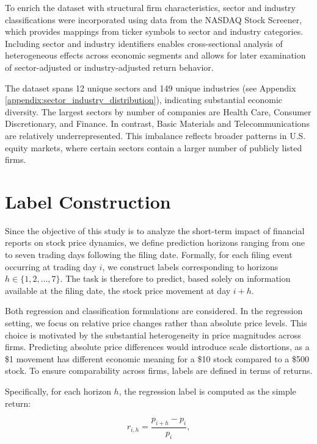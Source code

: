 To enrich the dataset with structural firm characteristics, sector and industry classifications were incorporated using data from the NASDAQ Stock Screener\cite{nasdaq_screener}, which provides mappings from ticker symbols to sector and industry categories. 
Including sector and industry identifiers enables cross-sectional analysis of heterogeneous effects across economic segments and allows for later examination of sector-adjusted or industry-adjusted return behavior.

The dataset spans 12 unique sectors and 149 unique industries (see Appendix \ref{appendix:sector_industry_distribution}), indicating substantial economic diversity. 
The largest sectors by number of companies are Health Care, Consumer Discretionary, and Finance. In contrast, Basic Materials and Telecommunications are relatively underrepresented. This imbalance reflects broader patterns in U.S. equity markets, where certain sectors contain a larger number of publicly listed firms.

\section{Label Construction}

Since the objective of this study is to analyze the short-term impact of financial reports on stock price dynamics, we define prediction horizons ranging from one to seven trading days following the filing date. Formally, for each filing event occurring at trading day $i$, we construct labels corresponding to horizons $h \in \{1,2,\dots,7\}$. The task is therefore to predict, based solely on information available at the filing date, the stock price movement at day $i+h$.

Both regression and classification formulations are considered. In the regression setting, we focus on relative price changes rather than absolute price levels. This choice is motivated by the substantial heterogeneity in price magnitudes across firms. Predicting absolute price differences would introduce scale distortions, as a \$1 movement has different economic meaning for a \$10 stock compared to a \$500 stock. To ensure comparability across firms, labels are defined in terms of returns.

Specifically, for each horizon $h$, the regression label is computed as the simple return:

\begin{equation}
r_{i,h} = \frac{p_{i+h} - p_i}{p_i},
\end{equation}

